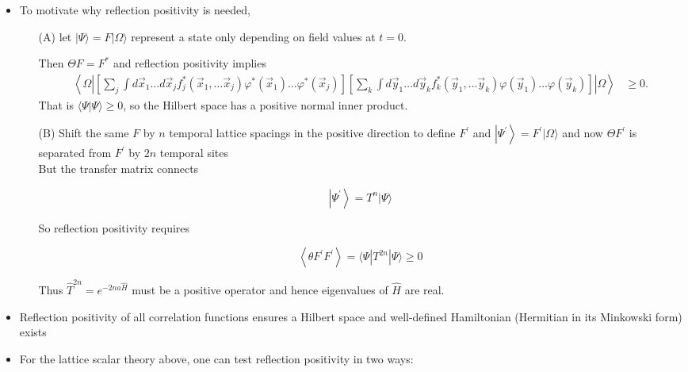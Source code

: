 \begin{itemize}
  \item To motivate why reflection positivity is needed,
\begin{enumerate}
    \item [(A)] let \(|\Psi\rangle=F|\Omega\rangle\) represent a state only depending on field values at $t=0$.

Then \(\Theta F=F^\ast\) and reflection positivity implies
\begin{align}
    \left \langle \Omega \left|\left[ \sum_j \int d \vec{x}_1 \ldots d \vec{x}_j f_j^*(\vec{x}_1,\ldots \vec{x}_j)\varphi^*(\vec{x}_1)\ldots\varphi^*(\vec{x}_j) \right] \left[ \sum_k \int d \vec{y}_1 \ldots d \vec{y}_k f_k^*(\vec{y}_1,\ldots \vec{y}_k)\varphi(\vec{y}_1)\ldots\varphi(\vec{y}_k) \right] \right| \Omega \right\rangle &\geq 0.
\end{align}
That is $\langle \Psi | \Psi \rangle \geq 0$,
so the Hilbert space has a positive normal inner product.

\item [(B)] Shift the same \(F\) by $n$ temporal lattice spacings in the positive direction to define \(F^{\prime}\) and \(\left|\Psi^{\prime}\right\rangle=F^{\prime}|\Omega\rangle\) and now \(\Theta F^{\prime}\) is separated from \(F^{\prime}\) by \(2 n\) temporal sites\\
But the transfer matrix connects

\begin{equation}
\left|{\Psi}^{\prime}\right\rangle=T^{n}|{\Psi}\rangle
\end{equation}

So reflection positivity requires

\begin{equation}
\left\langle\theta F^{\prime} F^{\prime}\right\rangle=\langle\Psi| T^{2 n}|\Psi\rangle \geqslant 0
\end{equation}

Thus \(\hat{T}^{2 n}=e^{-2 n a \hat{H}}\) must be a positive operator and hence eigenvalues of $\hat{H}$ are real.

\end{enumerate}

  \item Reflection positivity of all correlation functions ensures a Hilbert space and well-defined Hamiltonian (Hermitian in its Minkowski form) exists
  \item For the lattice scalar theory above, one can test reflection positivity in two ways:


\end{itemize}
